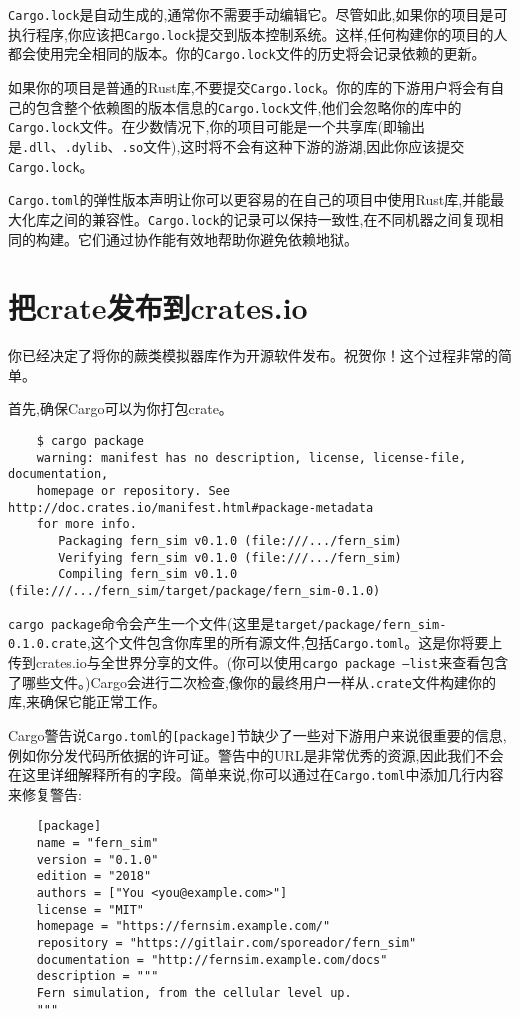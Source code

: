 \texttt{Cargo.lock}是自动生成的,通常你不需要手动编辑它。尽管如此,如果你的项目是可执行程序,你应该把\texttt{Cargo.lock}提交到版本控制系统。这样,任何构建你的项目的人都会使用完全相同的版本。你的\texttt{Cargo.lock}文件的历史将会记录依赖的更新。

如果你的项目是普通的Rust库,不要提交\texttt{Cargo.lock}。你的库的下游用户将会有自己的包含整个依赖图的版本信息的\texttt{Cargo.lock}文件,他们会忽略你的库中的\texttt{Cargo.lock}文件。在少数情况下,你的项目可能是一个共享库(即输出是\texttt{.dll}、\texttt{.dylib}、\texttt{.so}文件),这时将不会有这种下游的游湖,因此你应该提交\texttt{Cargo.lock}。

\texttt{Cargo.toml}的弹性版本声明让你可以更容易的在自己的项目中使用Rust库,并能最大化库之间的兼容性。\texttt{Cargo.lock}的记录可以保持一致性,在不同机器之间复现相同的构建。它们通过协作能有效地帮助你避免依赖地狱。

\section{把crate发布到crates.io}

你已经决定了将你的蕨类模拟器库作为开源软件发布。祝贺你！这个过程非常的简单。

首先,确保Cargo可以为你打包crate。

\begin{verbatim}
    $ cargo package
    warning: manifest has no description, license, license-file, documentation,
    homepage or repository. See http://doc.crates.io/manifest.html#package-metadata
    for more info.
       Packaging fern_sim v0.1.0 (file:///.../fern_sim)
       Verifying fern_sim v0.1.0 (file:///.../fern_sim)
       Compiling fern_sim v0.1.0 (file:///.../fern_sim/target/package/fern_sim-0.1.0)
\end{verbatim}

\texttt{cargo package}命令会产生一个文件(这里是\texttt{target/package/fern\_sim-0.1.0.crate},这个文件包含你库里的所有源文件,包括\texttt{Cargo.toml}。这是你将要上传到crates.io与全世界分享的文件。(你可以使用\texttt{cargo package --list}来查看包含了哪些文件。)Cargo会进行二次检查,像你的最终用户一样从\texttt{.crate}文件构建你的库,来确保它能正常工作。

Cargo警告说\texttt{Cargo.toml}的\texttt{[package]}节缺少了一些对下游用户来说很重要的信息,例如你分发代码所依据的许可证。警告中的URL是非常优秀的资源,因此我们不会在这里详细解释所有的字段。简单来说,你可以通过在\texttt{Cargo.toml}中添加几行内容来修复警告:
\begin{verbatim}
    [package]
    name = "fern_sim"
    version = "0.1.0"
    edition = "2018"
    authors = ["You <you@example.com>"]
    license = "MIT"
    homepage = "https://fernsim.example.com/"
    repository = "https://gitlair.com/sporeador/fern_sim"
    documentation = "http://fernsim.example.com/docs"
    description = """
    Fern simulation, from the cellular level up.
    """
\end{verbatim}

